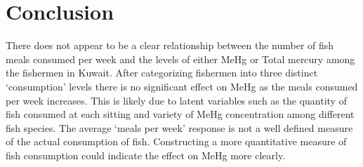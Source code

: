 \documentclass[twocolumn, 12pt]{report}
\begin{document}
\section{Conclusion}

There does not appear to be a clear relationship between the number of fish meals consumed per week and the levels of either MeHg or Total mercury among the fishermen in Kuwait. After categorizing fishermen into three distinct `consumption' levels there is no significant effect on MeHg as the meals consumed per week increases. This is likely due to latent variables such as the quantity of fish consumed at each sitting and variety of MeHg concentration among different fish species. The average `meals per week' response is not a well defined measure of the actual consumption of fish. Constructing a more quantitative measure of fish consumption could indicate the effect on MeHg more clearly.   


\end{document}
